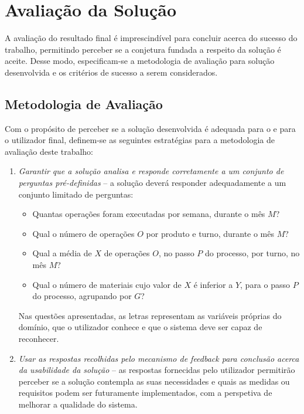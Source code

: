 \section{Avaliação da Solução}
\label{sec:chap01_solutionevaluation}
A avaliação do resultado final é imprescindível para concluir acerca do sucesso do trabalho, permitindo perceber se a conjetura fundada a respeito da solução é aceite. Desse modo, especificam-se a metodologia de avaliação para solução desenvolvida e os critérios de sucesso a serem considerados.

\subsection{Metodologia de Avaliação}
Com o propósito de perceber se a solução desenvolvida é adequada para o {\productname} e para o utilizador final, definem-se as seguintes estratégias para a metodologia de avaliação deste trabalho:

\begin{enumerate}
\label{enum:chap01_qualitystrategies}
    \item 
    {
        \textit{Garantir que a solução analisa e responde corretamente a um conjunto de perguntas pré-definidas} -- a solução deverá responder adequadamente a um conjunto limitado de perguntas:
        \begin{itemize}
            \item 
            {
                Quantas operações foram executadas por semana, durante o mês $M$?
            }
            \item
            {
                Qual o número de operações $O$ por produto e turno, durante o mês $M$?
            }
            \item
            {
                Qual a média de $X$ de operações $O$, no passo $P$ do processo, por turno, no mês $M$? 
            }
            \item
            {
                Qual o número de materiais cujo valor de $X$ é inferior a $Y$, para o passo $P$ do processo, agrupando por $G$?
            }
        \end{itemize}
        
        Nas questões apresentadas, as letras representam as variáveis próprias do domínio, que o utilizador conhece e que o sistema deve ser capaz de reconhecer.
    }
    \item
    {
        \textit{Usar as respostas recolhidas pelo mecanismo de feedback para conclusão acerca da usabilidade da solução} -- as respostas fornecidas pelo utilizador permitirão perceber se a solução contempla as suas necessidades e quais as medidas ou requisitos podem ser futuramente implementados, com a perspetiva de melhorar a qualidade do sistema.
    }
\end{enumerate}


